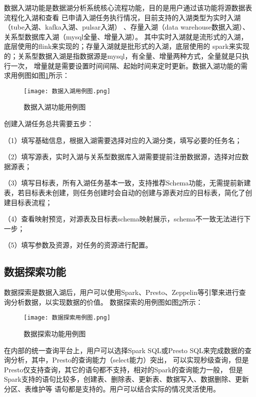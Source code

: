数据入湖功能是数据湖分析系统核心流程功能，目的是用户通过该功能将源数据表流程化入湖和查看
已申请入湖任务执行情况，目前支持的入湖类型为实时入湖（tube入湖、kafka入湖、pulsar入湖）
、存量入湖（data warehouse数据入湖）、关系型数据库入湖（mysql全量、增量入湖）。
其中实时入湖就是流形式的入湖，底层使用的flink来实现的；存量入湖就是批形式的入湖，底层使用的
spark来实现的；关系型数据入湖是指数据源是mysql，有全量、增量两种方式，全量就是只执行一次，
增量就是需要设置时间间隔、起始时间来定时更新。数据入湖功能的需求用例图如图\ref{fig:数据入湖用例图}所示：

\begin{figure}[H]
  \centering
  \texttt{[image: 数据入湖用例图.png]}
  \caption{数据入湖功能用例图}
  \label{fig:数据入湖用例图}
\end{figure}

创建入湖任务总共需要五步：

（1）填写基础信息，根据入湖需要选择对应的入湖分类，填写必要的任务名；

（2）填写源表，实时入湖与关系型数据库入湖需要提前注册数据源，选择对应数据源表；

（3）填写目标表，所有入湖任务基本一致，支持推荐Schema功能，无需提前新建表，若目标表未创建，则任务创建时会自动的创建与源表对应的目标表，简化了创建目标表流程；

（4）查看映射预览，对源表及目标表schema映射展示，schema不一致无法进行下一步；

（5）填写参数及资源，对任务的资源进行配置。

\subsection{数据探索功能}

数据探索是数据入湖后，用户可以使用Spark、Presto、Zeppelin等引擎来进行查询分析数据，以实现数据的价值。
数据探索的用例图如图\ref{fig:数据探索用例图}所示：

\begin{figure}[H]
  \centering
  \texttt{[image: 数据探索用例图.png]}
  \caption{数据探索功能用例图}
  \label{fig:数据探索用例图}
\end{figure}

在内部的统一查询平台上，用户可以选择Spark SQL或Presto SQL来完成数据的查询分析，其中，Presto的查询能力（select能力）突出，
可以实现秒级查询，但是Presto仅支持查询，其它的语句都不支持，相对的Spark的查询能力一般，
但是Spark支持的语句比较多，创建表、删除表、更新表、数据写入、数据删除、更新分区、表维护等
语句都是支持的。用户可以结合实际的情况灵活使用。

